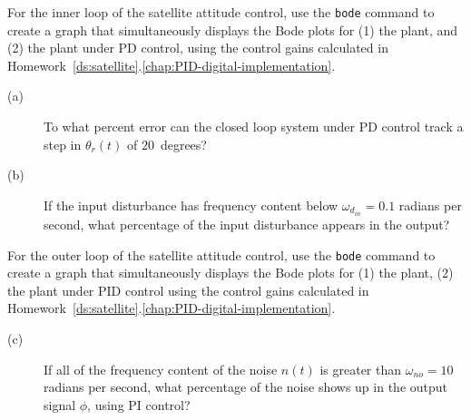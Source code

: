 
For the inner loop of the satellite attitude control, use the \texttt{bode} command to create a graph that simultaneously displays the Bode plots for (1) the plant, and (2) the plant under PD control, using the control gains calculated in Homework~\ref{ds:satellite}.\ref{chap:PID-digital-implementation}.  
\begin{description}
\item[(a)]  To what percent error can the closed loop system under PD control track a step in $\theta_r(t)$ of $20$~degrees? 
\item[(b)] If the input disturbance has frequency content below $\omega_{d_{in}}=0.1$ radians per second, what percentage of the input disturbance appears in the output?  
\end{description}

For the outer loop of the satellite attitude control, use the \texttt{bode} command to create a graph that simultaneously displays the Bode plots for (1) the plant, (2) the plant under PID control using the control gains calculated in Homework~\ref{ds:satellite}.\ref{chap:PID-digital-implementation}.  
\begin{description}
\item[(c)] If all of the frequency content of the noise $n(t)$ is greater than $\omega_{no} = 10$ radians per second, what percentage of the noise shows up in the output signal $\phi$, using PI control?
\end{description}
